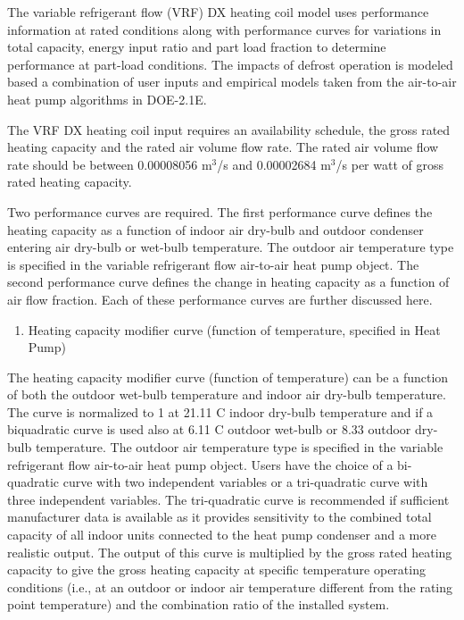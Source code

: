 The variable refrigerant flow (VRF) DX heating coil model uses performance information at rated conditions along with performance curves for variations in total capacity, energy input ratio and part load fraction to determine performance at part-load conditions. The impacts of defrost operation is modeled based a combination of user inputs and empirical models taken from the air-to-air heat pump algorithms in DOE-2.1E.

The VRF DX heating coil input requires an availability schedule, the gross rated heating capacity and the rated air volume flow rate. The rated air volume flow rate should be between 0.00008056 m\(^{3}\)/s and 0.00002684 m\(^{3}\)/s per watt of gross rated heating capacity.

Two performance curves are required. The first performance curve defines the heating capacity as a function of indoor air dry-bulb and outdoor condenser entering air dry-bulb or wet-bulb temperature. The outdoor air temperature type is specified in the variable refrigerant flow air-to-air heat pump object. The second performance curve defines the change in heating capacity as a function of air flow fraction. Each of these performance curves are further discussed here.

\begin{enumerate}
\def\labelenumi{\arabic{enumi})}
\tightlist
\item
  Heating capacity modifier curve (function of temperature, specified in Heat Pump)
\end{enumerate}

The heating capacity modifier curve (function of temperature) can be a function of both the outdoor wet-bulb temperature and indoor air dry-bulb temperature. The curve is normalized to 1 at 21.11 C indoor dry-bulb temperature and if a biquadratic curve is used also at 6.11 C outdoor wet-bulb or 8.33 outdoor dry-bulb temperature. The outdoor air temperature type is specified in the variable refrigerant flow air-to-air heat pump object. Users have the choice of a bi-quadratic curve with two independent variables or a tri-quadratic curve with three independent variables. The tri-quadratic curve is recommended if sufficient manufacturer data is available as it provides sensitivity to the combined total capacity of all indoor units connected to the heat pump condenser and a more realistic output. The output of this curve is multiplied by the gross rated heating capacity to give the gross heating capacity at specific temperature operating conditions (i.e., at an outdoor or indoor air temperature different from the rating point temperature) and the combination ratio of the installed system.

